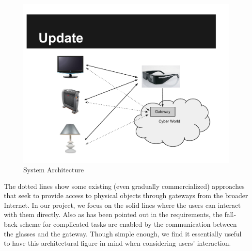 \begin{figure}
  \centering
  \includegraphics[width=\linewidth]{../figs/sysarch.pdf}
  \caption{System Architecture}
  \label{fig:sysarch}
\end{figure}

The dotted lines show some existing (even gradually commercialized) approaches that seek to provide access to physical objects through gateways from the broader Internet. In our project, we focus on the solid lines where the users can interact with them directly. Also as has been pointed out in the requirements, the fall-back scheme for complicated tasks are enabled by the communication between the glasses and the gateway. Though simple enough, we find it essentially useful to have this architectural figure in mind when considering users' interaction.





